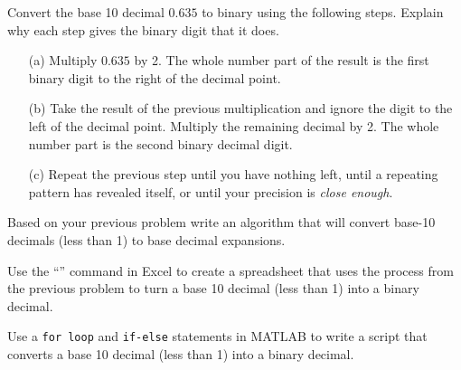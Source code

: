 \begin{problem}
    Convert the base 10 decimal $0.635$ to binary using the following steps.  Explain why
    each step gives the binary digit that it does.
    \begin{enumerate}
        \item[(a)] Multiply $0.635$ by 2.  The whole number part of the result is the
            first binary digit to the right of the decimal point. 
        \item[(b)] Take the result of the previous multiplication and ignore the digit to the
            left of the decimal point.  Multiply the remaining decimal by 2.  The whole
            number part is the second binary decimal digit. 
        \item[(c)] Repeat the previous step until you have nothing left, until a
            repeating pattern has revealed itself, or until your precision is {\it close
            enough}.  
    \end{enumerate}
\end{problem}
\begin{problem}
    Based on your previous problem write an algorithm that will convert base-10 decimals
    (less than 1) to base decimal expansions.
\end{problem}


\begin{problem}
    Use the ``'' command in Excel to create a spreadsheet that uses the process from the
    previous problem to turn a base 10 decimal (less than 1) into a binary decimal.
\end{problem}

\begin{problem}
    Use a \texttt{for loop} and \texttt{if-else} statements in MATLAB to write a script
    that converts a base 10 decimal (less than 1) into a binary decimal.
\end{problem}

